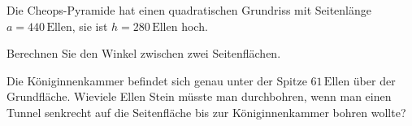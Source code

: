 Die Cheops-Pyramide hat einen quadratischen Grundriss mit Seitenlänge
$a=440\,\text{Ellen}$, sie ist $h=280\,\text{Ellen}$ hoch.
\begin{center}
\end{center}
\begin{teilaufgaben}
\item
Berechnen Sie den Winkel zwischen zwei Seitenflächen.
\item
Die Königinnenkammer befindet sich genau unter der Spitze $61\,\text{Ellen}$
über der Grundfläche. Wieviele Ellen Stein müsste man durchbohren, wenn
man einen Tunnel senkrecht auf die Seitenfläche bis zur Königinnenkammer
bohren wollte?
\end{teilaufgaben}


